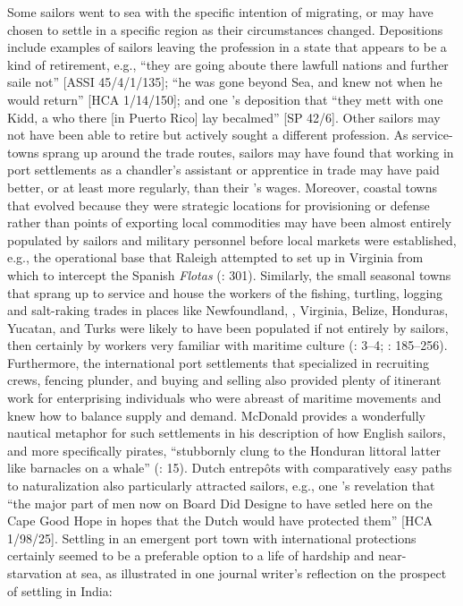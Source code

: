 Some sailors went to sea with the specific intention of migrating, or may have chosen to settle in a specific region as their circumstances changed.  Depositions include examples of sailors leaving the profession in a state that appears to be a kind of retirement, e.g., “they are going aboute there lawfull nations and further saile not” [ASSI 45/4/1/135]; “he was gone beyond Sea, and knew not when he would return” [HCA 1/14/150]; and one ’s deposition that “they mett with one Kidd, a  who there [in Puerto Rico] lay becalmed” [SP 42/6]. Other sailors may not have been able to retire but actively sought a different profession. As service-towns sprang up around the trade routes, sailors may have found that working in port settlements as a chandler’s assistant or apprentice in trade may have paid better, or at least more regularly, than their ’s wages. Moreover, coastal towns that evolved because they were strategic locations for provisioning or defense rather than points of exporting local commodities may have been almost entirely populated by sailors and military personnel before local markets were established, e.g., the operational base that Raleigh attempted to set up in Virginia from which to intercept the Spanish \textit{Flotas} (\citealt{Bicheno2012}: 301). Similarly, the small seasonal towns that sprang up to service and house the workers of the fishing, turtling, logging and salt-raking trades in places like Newfoundland, , Virginia, Belize, Honduras, Yucatan, and Turks were likely to have been populated if not entirely by sailors, then certainly by workers very familiar with maritime culture (\citealt{Draper2016}: 3–4; \citealt{Jarvis2010}: 185–256). Furthermore, the international port settlements that specialized in recruiting crews, fencing plunder, and buying and selling  also provided plenty of itinerant work for enterprising individuals who were abreast of maritime movements and knew how to balance supply and demand. McDonald provides a wonderfully nautical metaphor for such settlements in his description of how English sailors, and more specifically pirates, “stubbornly clung to the Honduran littoral latter like barnacles on a whale” (\citealt{McDonald2016}: 15). Dutch entrepôts with comparatively easy paths to naturalization also particularly attracted sailors, e.g., one ’s revelation that “the major part of men now on Board Did Designe to have setled here on the Cape Good Hope in hopes that the Dutch would have protected them” [HCA 1/98/25]. Settling in an emergent port town with international protections certainly seemed to be a preferable option to a life of hardship and near-starvation at sea, as illustrated in one journal writer’s reflection on the prospect of settling in India:

